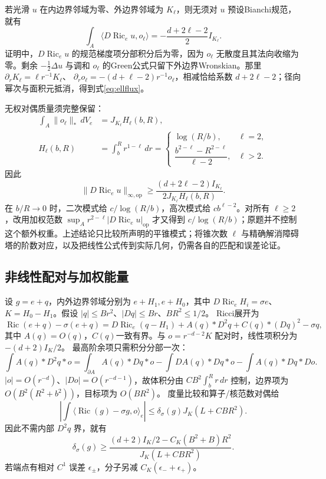 \documentclass[UTF8,a4paper,11pt,fontset=fandol]{ctexart}
\numberwithin{equation}{section}
\theoremstyle{definition}
\newcommand{\Ric}{\operatorname{Ric}}
\newcommand{\op}{\mathrm{op}}
\begin{document}
若光滑 $u$ 在内边界邻域为零、外边界邻域为 $K_\ell$，则无须对 $u$ 预设Bianchi规范，就有
\begin{equation}\label{eq:ellflux}
\int_A\langle D\Ric_e u,o_\ell\rangle
=-\frac{d+2\ell-2}{2}I_{K_\ell}.
\end{equation}
证明中，$D\Ric_eu$ 的规范梯度项分部积分后为零，因为 $o_\ell$ 无散度且其法向收缩为零。剩余 $-\frac12\Delta u$ 与调和 $o_\ell$ 的Green公式只留下外边界Wronskian。那里
$\partial_rK_\ell=\ell r^{-1}K_\ell$、
$\partial_ro_\ell=-(d+\ell-2)r^{-1}o_\ell$，相减恰给系数 $d+2\ell-2$；径向幂次与面积元抵消，得到式\eqref{eq:ellflux}。

无权对偶质量须完整保留：
\begin{align}
\int_A\|o_\ell\|_*\,dV_e
&=J_{K_\ell}H_\ell(b,R),\\
H_\ell(b,R)&=\int_b^Rr^{1-\ell}\,dr
=\begin{cases}
\log(R/b),&\ell=2,\\[1mm]
\dfrac{b^{2-\ell}-R^{2-\ell}}{\ell-2},&\ell>2.
\end{cases}
\end{align}
因此
\begin{equation}\label{eq:ellfluxbound}
\|D\Ric_eu\|_{\infty,\op}
\ge\frac{(d+2\ell-2)I_{K_\ell}}{2J_{K_\ell}H_\ell(b,R)}.
\end{equation}
在 $b/R\to0$ 时，二次模式给 $c/\log(R/b)$，高次模式给 $cb^{\ell-2}$。对所有 $\ell\ge2$，改用加权范数 $\sup_A r^{2-\ell}|D\Ric_eu|_{\op}$ 才又得到 $c/\log(R/b)$；原题并不控制这个额外权重。上述结论只比较所声明的平锥模式；将锥次数 $\ell$ 与精确解消障碍塔的阶数对应，以及把线性公式传到实际几何，仍需各自的匹配和误差论证。

\subsection{非线性配对与加权能量}
设 $g=e+q$，内外边界邻域分别为 $e+H_1,e+H_0$，其中
$D\Ric_eH_i=\sigma e$、$K=H_0-H_1$。假设
$|q|\le Br^2$、$|Dq|\le Br$、$BR^2\le1/2$。
Ricci展开为
\[
\Ric(e+q)-\sigma(e+q)=D\Ric_e(q-H_1)
+A(q)*D^2q+C(q)*(Dq)^2-\sigma q,
\]
其中 $A(q)=O(q)$，$C(q)$一致有界。与 $o=r^{-d-2}K$ 配对时，线性项积分为 $-(d+2)I_K/2$。
最高阶余项只需积分分部一次：
\[
\int A(q)*D^2q*o
=\int_{\partial A}A(q)*Dq*o
-\int DA(q)*Dq*o-\int A(q)*Dq*Do.
\]
$|o|=O(r^{-d})$、$|Do|=O(r^{-d-1})$，故体积分由
$CB^2\int_b^Rr\,dr$ 控制，边界项为 $O(B^2(R^2+b^2))$，目标项为 $O(BR^2)$。
度量比较和算子/核范数对偶给
\[
\left|\int\langle\Ric(g)-\sigma g,o\rangle_e\right|
\le\delta_\sigma(g)J_K(L+CBR^2).
\]
因此不需内部 $D^2q$ 界，就有
\begin{equation}\label{eq:nonlinearflux}
\delta_\sigma(g)\ge
\frac{(d+2)I_K/2-C_K(B^2+B)R^2}
{J_K(L+CBR^2)}.
\end{equation}
若端点有相对 $C^1$ 误差 $\epsilon_\pm$，分子另减 $C_K(\epsilon_-+\epsilon_+)$。
\end{document}
